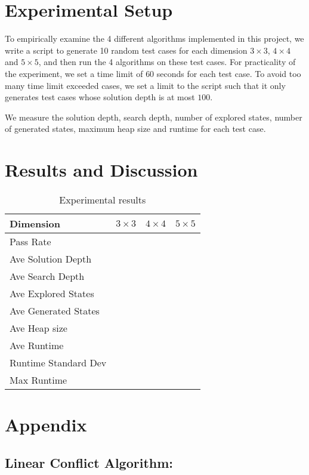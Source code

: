 \documentclass{llncs}
\begin{document}
\section{Experimental Setup}
To empirically examine the 4 different algorithms implemented in this project, we write a script to generate 10 random test cases for each dimension $3 \times 3$, $4 \times 4$ and $5 \times 5$, and then run the 4 algorithms on these test cases. For practicality of the experiment, we set a time limit of $60$ seconds for each test case. To avoid too many time limit exceeded cases, we set a limit to the script such that it only generates test cases whose solution depth is at most $100$.

We measure the solution depth, search depth, number of explored states, number of generated states, maximum heap size and runtime for each test case.

\section{Results and Discussion}
\begin{table}
	\centering
	\begin{tabular}{l|l|l|l} \hline
		Dimension & $3 \times 3$ & $4 \times 4$ & $5 \times 5$ \\\hline
		Pass Rate &  &  & \\
		Ave Solution Depth &  &  & \\
		Ave Search Depth &  &  & \\
		Ave Explored States &  &  & \\
		Ave Generated States &  &  & \\
		Ave Heap size &  &  & \\
		Ave Runtime &  &  & \\
		Runtime Standard Dev &  &  & \\
		Max Runtime &  &  & \\
		\hline
	\end{tabular}
	\caption{Experimental results}
	\label{tab:one}
\end{table}

\newpage




\newpage
\section{Appendix}

\subsection{Linear Conflict Algorithm:}
\end{document}
